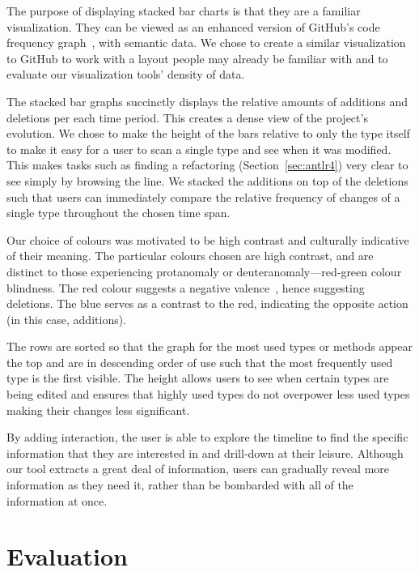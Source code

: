 The purpose of displaying stacked bar charts is that they are a familiar visualization. They can be viewed as an enhanced version of GitHub's code frequency graph~\cite{github-graphs}, with semantic data. We chose to create a similar visualization to GitHub to work with a layout people may already be familiar with and to evaluate our visualization tools' density of data.

The stacked bar graphs succinctly displays the relative amounts of additions and deletions per each time period. This creates a dense view of the project's evolution. We chose to make the height of the bars relative to only the type itself to make it easy for a user to scan a single type and see when it was modified. This makes tasks such as finding a refactoring (Section~\ref{sec:antlr4}) very clear to see simply by browsing the line. We stacked the additions on top of the deletions such that users can immediately compare the relative frequency of changes of a single type throughout the chosen time span.

Our choice of colours was motivated to be high contrast and culturally indicative of their meaning. The particular colours chosen are high contrast, and are distinct to those experiencing protanomaly or deuteranomaly---red-green colour blindness. The red colour suggests a negative valence~\cite{moller2009}, hence suggesting deletions. The blue serves as a contrast to the red, indicating the opposite action (in this case, additions).

The rows are sorted so that the graph for the most used types or methods appear the top and are in descending order of use such that the most frequently used type is the first visible. The height allows users to see when certain types are being edited and ensures that highly used types do not overpower less used types making their changes less significant.

By adding interaction, the user is able to explore the timeline to find the specific information that they are interested in and drill-down at their leisure. Although our tool extracts a great deal of information, users can gradually reveal more information as they need it, rather than be bombarded with all of the information at once.


\section{Evaluation}
\label{sec:eval}


